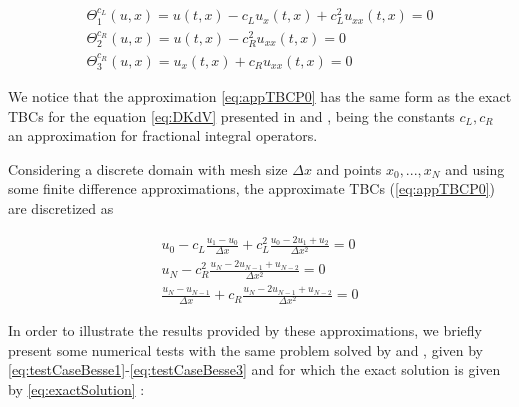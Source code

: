 
\begin{equation}
  \label{eq:appTBCP0}
    \begin{gathered}
        \Theta_1^{c_L}(u,x) = u(t,x) - c_L u_x(t,x)  + c_L^2  u_{xx}(t,x) = 0 \\
        \Theta_2^{c_R}(u,x) =  u(t,x) - c_R^2    u_{xx}(t,x) = 0\\
        \Theta_3^{c_R} (u,x)= u_x(t,x) + c_R u_{xx}(t,x)  = 0
    \end{gathered}
\end{equation}

\indent We notice that the approximation \eqref{eq:appTBCP0} has the same form as the exact TBCs for the equation \eqref{eq:DKdV} presented in \cite{zheng2008} and \cite{besse2015}, being the constants $c_L,c_R$ an approximation for fractional integral operators. 

\indent Considering a discrete domain with mesh size $\Delta x$ and points $x_0, ..., x_N$ and using some finite difference approximations, the approximate TBCs (\ref{eq:appTBCP0}) are discretized as

\begin{equation}
\label{eq:appDiscTBCP0}
    \begin{gathered}
        u_0 - c_L \frac{u_1 - u_0}{\Delta x}  + c_L^2  \frac{u_0 -2u_1 + u_2}{\Delta x^2} = 0 \\
        u_N - c_R^2    \frac{u_N -2u_{N-1} + u_{N-2}}{\Delta x^2} = 0 \\
        \frac{u_N - u_{N-1}}{\Delta x}  + c_R    \frac{u_N -2u_{N-1} + u_{N-2}}{\Delta x^2} = 0 
    \end{gathered}
\end{equation}

\indent In order to illustrate the results provided by these approximations, we briefly present some numerical tests with the same problem solved by \cite{zheng2008} and \cite{besse2015}, given by \eqref{eq:testCaseBesse1}-\eqref{eq:testCaseBesse3} and for which the exact solution is given by \eqref{eq:exactSolution} :

